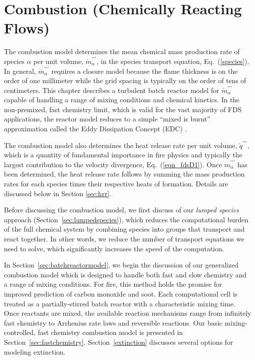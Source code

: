 

\chapter{Combustion (Chemically Reacting Flows)}
\label{chapter:combustion}

\label{combustionsection}
The combustion model determines the mean chemical mass production rate of species $\alpha$ per unit volume, $\dot{m}^{\prime\prime\prime}_{\alpha}$, in the species transport equation, Eq.~(\ref{species}).  In general, $\dot{m}^{\prime\prime\prime}_{\alpha}$ requires a closure model because the flame thickness is on the order of one millimeter while the grid spacing is typically on the order of tens of centimeters.  This chapter describes a turbulent batch reactor model for $\dot{m}^{\prime\prime\prime}_{\alpha}$ capable of handling a range of mixing conditions and chemical kinetics.  In the non-premixed, fast chemistry limit, which is valid for the vast majority of FDS applications, the reactor model reduces to a simple ``mixed is burnt'' approximation called the Eddy Dissipation Concept (EDC) \cite{Magnussen:1,Poinsot:TNC}.

The combustion model also determines the heat release rate per unit volume, $\dot{q}^{\prime\prime\prime}$, which is a quantity of fundamental importance in fire physics and typically the largest contribution to the velocity divergence, Eq.~(\ref{eqn_fdsD1}).  Once $\dot{m}^{\prime\prime\prime}_{\alpha}$ has been determined, the heat release rate follows by summing the mass production rates for each species times their respective heats of formation.  Details are discussed below in Section \ref{sec:hrr}.

Before discussing the combustion model, we first discuss of our \emph{lumped species} approach (Section~\ref{sec:lumpedspecies}), which reduces the computational burden of the full chemical system by combining species into groups that transport and react together.  In other words, we reduce the number of transport equations we need to solve, which significantly increases the speed of the computation.

In Section~\ref{sec:batchreactormodel}, we begin the discussion of our generalized combustion model which is designed to handle both fast and slow chemistry and a range of mixing conditions.  For fire, this method holds the promise for improved prediction of carbon monoxide and soot. Each computational cell is treated as a partially-stirred batch reactor with a characteristic mixing time.  Once reactants are mixed, the available reaction mechanisms range from infinitely fast chemistry to Arrhenius rate laws and reversible reactions. Our basic mixing-controlled, fast chemistry combustion model is presented in Section~\ref{sec:fastchemistry}. Section~\ref{extinction} discusses several options for modeling extinction.

